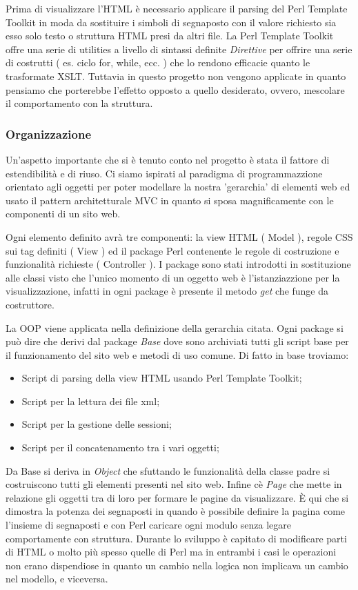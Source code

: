 Prima di visualizzare l'HTML \`e necessario applicare il parsing del Perl Template Toolkit in moda da sostituire i simboli di segnaposto con il valore richiesto sia esso solo testo o struttura HTML presi da altri file.
La Perl Template Toolkit offre una serie di utilities a livello di sintassi definite \textit{Direttive} per offrire una serie di costrutti ( es. ciclo for, while, ecc. ) che lo rendono efficacie quanto le trasformate XSLT. Tuttavia in questo progetto non vengono applicate in quanto pensiamo che porterebbe l'effetto opposto a quello desiderato, ovvero, mescolare il comportamento con la struttura.

\subsubsection{Organizzazione}
Un'aspetto importante che si \`e tenuto conto nel progetto \`e stata il fattore di estendibilit\`a e di riuso. Ci siamo ispirati al paradigma di programmazzione orientato agli oggetti per poter modellare la nostra 'gerarchia' di elementi web ed usato il pattern architetturale MVC in quanto si sposa magnificamente con le componenti di un sito web.

Ogni elemento definito avr\`a tre componenti: la view HTML ( Model ), regole CSS sui tag definiti ( View ) ed il package Perl contenente le regole di costruzione e funzionalit\`a richieste ( Controller ).
I package sono stati introdotti in sostituzione alle classi visto che l'unico momento di un oggetto web \`e l'istanziazzione per la visualizzazione, infatti in ogni package \`e presente il metodo \textit{get} che funge da costruttore.

La OOP viene applicata nella definizione della gerarchia citata. Ogni package si pu\`o dire che derivi dal package \textit{Base} dove sono archiviati tutti gli script base per il funzionamento del sito web e metodi di uso comune. Di fatto in base troviamo:
\begin{itemize}
\item Script di parsing della view HTML usando Perl Template Toolkit;
\item Script per la lettura dei file xml;
\item Script per la gestione delle sessioni;
\item Script per il concatenamento tra i vari oggetti;
\end{itemize}

Da Base si deriva in \textit{Object} che sfuttando le funzionalit\`a della classe padre si costruiscono tutti gli elementi presenti nel sito web. Infine c\`e \textit{Page} che mette in relazione gli oggetti tra di loro per formare le pagine da visualizzare. \`E qui che si dimostra la potenza dei segnaposti in quando \`e possibile definire la pagina come l'insieme di segnaposti e con Perl caricare ogni modulo senza legare comportamente con struttura.
Durante lo sviluppo \`e capitato di modificare parti di HTML o molto pi\`u spesso quelle di Perl ma in entrambi i casi le operazioni non erano dispendiose in quanto un cambio nella logica non implicava un cambio nel modello, e viceversa.

